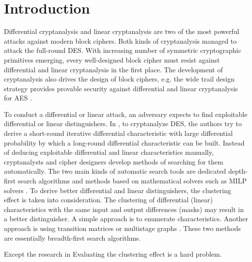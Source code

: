 \section{Introduction}

Differential cryptanalysis \cite{biham1991differential} and linear cryptanalysis \cite{matsui1993linear} are two of the most powerful attacks against modern block ciphers. Both kinds of cryptanalysis managed to attack the full-round DES. With increasing number of symmetric cryptographic primitives emerging, every well-designed block cipher must resist against differential and linear cryptanalysis in the first place. The development of cryptanalysis also drives the design of block ciphers, e.g. the wide trail design strategy provides provable security against differential and linear cryptanalysis for AES \cite{daemen2002design}. 

To conduct a differential or linear attack, an adversary expects to find exploitable differential or linear distinguishers. In \cite{biham1991differential,biham1992differential,knudsen1992iterative}, to cryptanalyze DES, the authors try to derive a short-round iterative differential characteristic with large differential probability by which a long-round differential characteristic can be built. Instead of deducing  exploitable differential and linear characteristics manually, cryptanalysts and cipher designers develop methods of searching for them automatically. The two main kinds of automatic search tools are dedicated depth-first search algorithms \cite{matsui1994correlation,ohta1995improving,aoki1997best,bao2014speeding,dobraunig2015heuristic} and methods based on mathematical solvers such as MILP solvers \cite{mouha2011differential,sun2013automatic,sun2014automatic,sun2014towards,zhou2019improving}. To derive better differential and linear distinguishers, the clustering effect is taken into consideration. The clustering of differential (linear) characteristics with the same input and output differences (masks) may result in a better distinguisher. A simple approach is to enumerate characteristics. Another approach is using transition matrices \cite{abdelraheem2012estimating} or multistage graphs \cite{EPRINT:HalVej18}. These two methods are essentially breadth-first search algorithms.

Except the research in \cite{biham1991differential,biham1992differential,knudsen1992iterative}
Evaluating the clustering effect is a hard problem.


